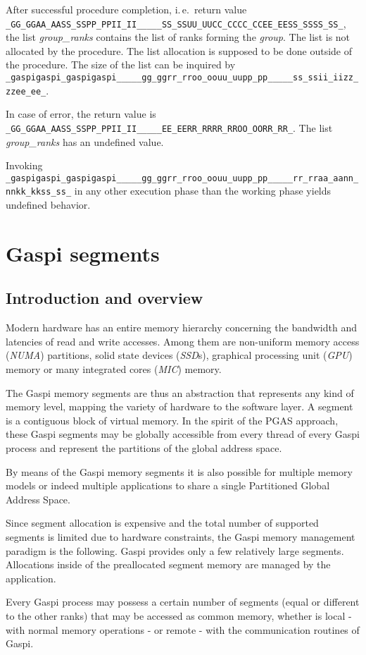 \documentclass{article}
\makeatletter
\newlength{\st}\setlength{\st}{0pt}
\newcommand{\zerowsep}{\hskip 0pt plus 0.1pt minus 0.1pt}
\newcommand{\ZSEP}[1]{\ifx#1\@@@EOZ@@@\let\next\relax\else\ifx#1\_#1\zerowsep\else#1\fi\let\next\ZSEP\fi\next}
\newcommand{\zsep}[1]{\ZSEP{}#1\@@@EOZ@@@}
\newcommand{\gaspiprefix}{gaspi}
\newcommand{\GASPI}{{\sc Gaspi}}
\newcommand{\function}[1]{{\tt #1}}
\newcommand{\parameter}[1]{{\it #1}}
\newcommand{\gaspifunction}[1]{\function{\protect\zsep{\gaspiprefix\_#1}}}
\newcommand{\GASPISUCC}{{\tt\protect\zsep{GASPI\_SUCCESS}}}
\newcommand{\GASPIGERR}{{\tt\protect\zsep{GASPI\_ERROR}}}
\makeatother
\begin{document}
After successful procedure completion, i.\,e.\ return value \GASPISUCC{},
the list \parameter{group\_ranks} contains the list of ranks forming the
\parameter{group}. The list is not allocated by the procedure. The
list allocation is supposed to be done outside of the procedure.
The size of the list can be inquired by \gaspifunction{group\_size}.

In case of error, the return value is \GASPIGERR{}. The list
\parameter{group\_ranks} has an undefined value.

Invoking
\gaspifunction{group\_ranks} in any other execution phase than the working phase
yields undefined behavior.


\section{\GASPI{} segments}

\subsection{Introduction and overview}

Modern hardware has an entire memory hierarchy concerning the
bandwidth and latencies of read and write accesses. Among them are
non-uniform memory access (\emph{NUMA}) partitions, solid state
devices (\emph{SSD}s), graphical processing unit (\emph{GPU}) memory
or many integrated cores (\emph{MIC}) memory.

The \GASPI{} memory segments are thus an abstraction that represents
any kind of memory level, mapping the variety of hardware to the
software layer. A segment is a contiguous block of virtual memory.
In the spirit of the PGAS approach, these \GASPI{}
segments may be globally accessible from every thread of every \GASPI{}
process and represent the partitions of the global address space.

By means of the \GASPI{} memory segments it is also possible for multiple 
memory models or indeed multiple applications to share a single Partitioned Global
Address Space.

Since segment allocation is expensive and the total number of supported
segments is limited due to hardware constraints, the \GASPI{} memory
management paradigm is the following.
\GASPI{} provides only a few relatively large segments.
Allocations inside of the preallocated segment memory are managed
by the application.

Every \GASPI{} process may possess a certain number of segments (equal or
different to the other ranks) that may be accessed as common memory,
whether is local - with normal memory operations - or remote - with
the communication routines of \GASPI{}.
\end{document}
